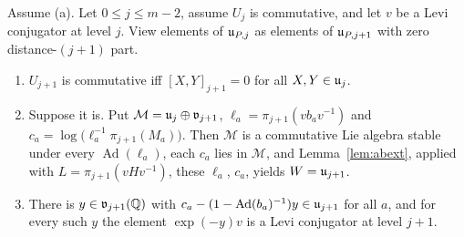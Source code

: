 \begin{proposition}\label{prop:layer}
Assume (a). Let $0\le j\le m-2$, assume $U_j$ is commutative, and let $v$ be a Levi conjugator at
level $j$. View elements of $\mathfrak{u}_{P,j}$ as elements of $\mathfrak{u}_{P,j+1}$ with zero distance-$(j+1)$ part.
\begin{enumerate}
\item $U_{j+1}$ is commutative iff $[X,Y]_{j+1}=0$ for all $X,Y\in\mathfrak{u}_j$.
\item Suppose it is. Put $\mathcal M=\mathfrak{u}_j\oplus\mathfrak v_{j+1}$,
$\ell_a=\pi_{j+1}(vb_av^{-1})$ and $c_a=\log\bigl(\ell_a^{-1}\pi_{j+1}(M_a)\bigr)$. Then
$\mathcal M$ is a commutative Lie algebra stable under every $\operatorname{Ad}(\ell_a)$, each $c_a$
lies in $\mathcal M$, and Lemma~\ref{lem:abext}, applied with $L=\pi_{j+1}(vHv^{-1})$, these
$\ell_a$, $c_a$, yields $W=\mathfrak{u}_{j+1}$.
\item There is $y\in\mathfrak v_{j+1}(\mathbb{Q})$ with $c_a-(1-\operatorname{Ad}(b_a)^{-1})y\in\mathfrak{u}_{j+1}$ for
all $a$, and for every such $y$ the element $\exp(-y)v$ is a Levi conjugator at level $j+1$.
\end{enumerate}
\end{proposition}
